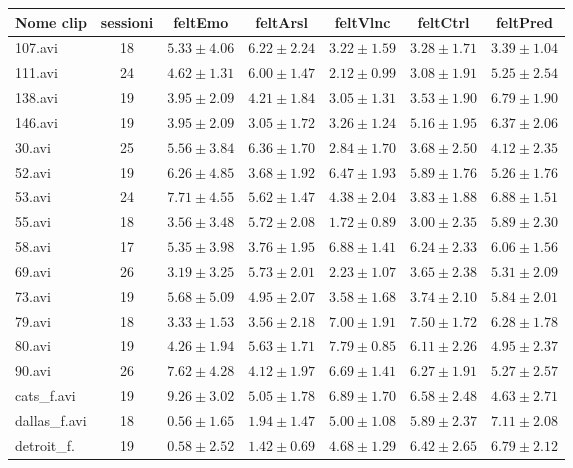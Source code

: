 \begin{table}[]
\begin{tabular}{l|c|c|c|c|c|c}
Nome clip & sessioni & feltEmo &  feltArsl &  feltVlnc &  feltCtrl &  feltPred \\
\hline
107.avi & 18 & $5.33 \pm 4.06$ & $6.22 \pm 2.24$ & $3.22 \pm 1.59$ & $3.28 \pm 1.71$ & $3.39 \pm 1.04$ \\
111.avi & 24 & $4.62 \pm 1.31$ & $6.00 \pm 1.47$ & $2.12 \pm 0.99$ & $3.08 \pm 1.91$ & $5.25 \pm 2.54$ \\
138.avi & 19 & $3.95 \pm 2.09$ & $4.21 \pm 1.84$ & $3.05 \pm 1.31$ & $3.53 \pm 1.90$ & $6.79 \pm 1.90$ \\
146.avi & 19 & $3.95 \pm 2.09$ & $3.05 \pm 1.72$ & $3.26 \pm 1.24$ & $5.16 \pm 1.95$ & $6.37 \pm 2.06$ \\
30.avi & 25 & $5.56 \pm 3.84$ & $6.36 \pm 1.70$ & $2.84 \pm 1.70$ & $3.68 \pm 2.50$ & $4.12 \pm 2.35$ \\
52.avi & 19 & $6.26 \pm 4.85$ & $3.68 \pm 1.92$ & $6.47 \pm 1.93$ & $5.89 \pm 1.76$ & $5.26 \pm 1.76$ \\
53.avi & 24 & $7.71 \pm 4.55$ & $5.62 \pm 1.47$ & $4.38 \pm 2.04$ & $3.83 \pm 1.88$ & $6.88 \pm 1.51$ \\
55.avi & 18 & $3.56 \pm 3.48$ & $5.72 \pm 2.08$ & $1.72 \pm 0.89$ & $3.00 \pm 2.35$ & $5.89 \pm 2.30$ \\
58.avi & 17 & $5.35 \pm 3.98$ & $3.76 \pm 1.95$ & $6.88 \pm 1.41$ & $6.24 \pm 2.33$ & $6.06 \pm 1.56$ \\
69.avi & 26 & $3.19 \pm 3.25$ & $5.73 \pm 2.01$ & $2.23 \pm 1.07$ & $3.65 \pm 2.38$ & $5.31 \pm 2.09$ \\
73.avi & 19 & $5.68 \pm 5.09$ & $4.95 \pm 2.07$ & $3.58 \pm 1.68$ & $3.74 \pm 2.10$ & $5.84 \pm 2.01$ \\
79.avi & 18 & $3.33 \pm 1.53$ & $3.56 \pm 2.18$ & $7.00 \pm 1.91$ & $7.50 \pm 1.72$ & $6.28 \pm 1.78$ \\
80.avi & 19 & $4.26 \pm 1.94$ & $5.63 \pm 1.71$ & $7.79 \pm 0.85$ & $6.11 \pm 2.26$ & $4.95 \pm 2.37$ \\
90.avi & 26 & $7.62 \pm 4.28$ & $4.12 \pm 1.97$ & $6.69 \pm 1.41$ & $6.27 \pm 1.91$ & $5.27 \pm 2.57$ \\
cats\_f.avi & 19 & $9.26 \pm 3.02$ & $5.05 \pm 1.78$ & $6.89 \pm 1.70$ & $6.58 \pm 2.48$ & $4.63 \pm 2.71$ \\
dallas\_f.avi & 18 & $0.56 \pm 1.65$ & $1.94 \pm 1.47$ & $5.00 \pm 1.08$ & $5.89 \pm 2.37$ & $7.11 \pm 2.08$ \\
detroit\_f. & 19 & $0.58 \pm 2.52$ & $1.42 \pm 0.69$ & $4.68 \pm 1.29$ & $6.42 \pm 2.65$ & $6.79 \pm 2.12$ \\

\end{tabular}
\end{table}
